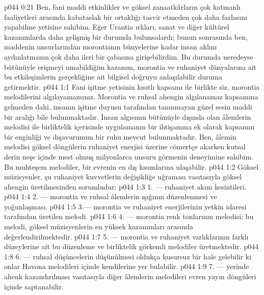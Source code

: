 \vs p044 0:21 Ben, fani maddi etkinlikler ve göksel zanaatkârların çok katmanlı faaliyetleri arasında kabataslak bir ortaklığı tasvir etmeden çok daha fazlasını yapabilme yetisine sahibim. Eğer Urantia ırkları, sanat ve diğer kültürel kazanımlarda daha gelişmiş bir durumda bulunsalardı; bunun sonrasında ben, maddenin unsurlarından morontianın bünyelerine kadar insan aklını aydınlatmanın çok daha ileri bir çabasına girişebilirdim. Bu durumda neredeyse bütünüyle erişmeyi umabildiğim kazanım, morontia ve ruhaniyet dünyalarına ait bu etkileşimlerin gerçekliğine ait bilgisel doğruyu anlaşılabilir duruma getirmektir.
\vs p044 1:1 Fani işitme yetisinin kısıtlı kapsamı ile birlikte siz, morontia melodilerini algılayamazsınız. Morontia ve ruhsal ahengin algılanamaz kapsamına gelmeden dahi, insanın işitme duyusu tarafından tanınmayan güzel sesin maddi bir aralığı bile bulunmaktadır. İnsan algısının bütünüyle dışında olan âlemlerin melodisi ile birliktelik içerisinde uygulamanın bir ihtişamına ek olarak kapsamın bir enginliği ve dışavurumun bir ruhu mevcut bulunmaktadır. Ben, âlemin melodisi göksel döngülerin ruhaniyet enerjisi üzerine cömertçe akarken kutsal derin neşe içinde mest olmuş milyonlarca unsuru görmenin deneyimine sahibim. Bu muhteşem melodiler, bir evrenin en dış kısımlarına ulaşabilir.
\vs p044 1:2 Göksel müzisyenler, şu ruhaniyet kuvvetlerin değişikliğe uğraması vasıtasıyla göksel ahengin üretilmesinden sorumludur:
\vs p044 1:3 1.\bibnobreakspace {} --- ruhaniyet akım kesintileri.
\vs p044 1:4 2.\bibnobreakspace {} --- morontia ve ruhsal âlemlerin ışığının düzenlenmesi ve yoğunlaşması.
\vs p044 1:5 3.\bibnobreakspace {}--- morontia ve ruhaniyet enerjilerinin yetkin idaresi tarafından üretilen melodi.
\vs p044 1:6 4.\bibnobreakspace {} --- morontia renk tonlarının melodisi; bu melodi, göksel müzisyenlerin en yüksek kazanımları arasında değerlendirilmektedir.
\vs p044 1:7 5.\bibnobreakspace {} --- morontia ve ruhaniyet varlıklarının farklı düzeylerine ait bu düzenleme ve birliktelik görkemli melodiler üretmektedir.
\vs p044 1:8 6.\bibnobreakspace {} --- ruhsal düşüncelerin düşünülmesi oldukça kusursuz bir hale gelebilir ki onlar Havona melodileri içinde kendilerine yer bulabilir.
\vs p044 1:9 7.\bibnobreakspace {} --- yerinde ahenk kazandırılması vasıtasıyla diğer âlemlerin melodileri evren yayın döngüleri içinde saptanabilir.
